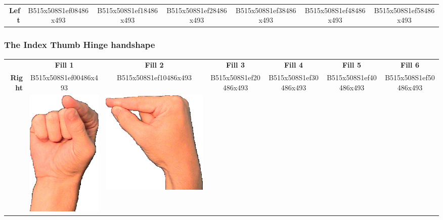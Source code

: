 \documentclass{article}
\begin{document}
\begin{center}
\begin{tabular}{r*{6}{c}}
\textbf{Left}&
B515x508S1ef08486x493&
B515x508S1ef18486x493&
B515x508S1ef28486x493&
B515x508S1ef38486x493&
B515x508S1ef48486x493&
B515x508S1ef58486x493\\
\end{tabular}
\end{center}

\subsubsection{The Index Thumb Hinge handshape}

\begin{center}
\begin{tabular}{r*{6}{c}}
&\textbf{Fill 1}&\textbf{Fill 2}&\textbf{Fill 3}&\textbf{Fill 4}&\textbf{Fill 5}&\textbf{Fill 6}\\
\multirow{2}{*}{\textbf{Right}}&
B515x508S1ef00486x493&
B515x508S1ef10486x493&
B515x508S1ef20486x493&
B515x508S1ef30486x493&
B515x508S1ef40486x493&
B515x508S1ef50486x493\\
&
\includegraphics[scale=0.1]{images/09-13-1.jpg}&
\includegraphics[scale=0.1]{images/09-13-2.jpg}&

\end{tabular}
\end{center}
\end{document}
